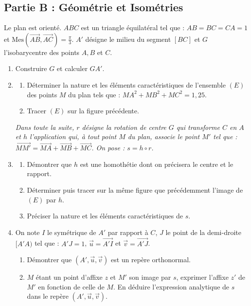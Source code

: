 \subsection*{Partie B : Géométrie et Isométries}
Le plan est orienté. $ABC$ est un triangle équilatéral tel que : $AB = BC = CA = 1$ et $\text{Mes}(\overrightarrow{AB}, \overrightarrow{AC}) = \frac{\pi}{3}$. $A'$ désigne le milieu du segment $[BC]$ et $G$ l'isobarycentre des points $A, B$ et $C$.
\begin{enumerate}
	\item Construire $G$ et calculer $GA'$.
	\item \begin{enumerate}
		\item Déterminer la nature et les éléments caractéristiques de l'ensemble $(E)$ des points $M$ du plan tels que : $MA^2 + MB^2 + MC^2 = 1,25$.
		\item Tracer $(E)$ sur la figure précédente.
	\end{enumerate}
	\textit{Dans toute la suite, $r$ désigne la rotation de centre $G$ qui transforme $C$ en $A$ et $h$ l'application qui, à tout point $M$ du plan, associe le point $M'$ tel que : $\overrightarrow{MM'} = \overrightarrow{MA} + \overrightarrow{MB} + \overrightarrow{MC}$. On pose : $s = h \circ r$.}
	\item \begin{enumerate}
		\item Démontrer que $h$ est une homothétie dont on précisera le centre et le rapport.
		\item Déterminer puis tracer sur la même figure que précédemment l'image de $(E)$ par $h$.
		\item Préciser la nature et les éléments caractéristiques de $s$.
	\end{enumerate}
	\item On note $I$ le symétrique de $A'$ par rapport à $C$, $J$ le point de la demi-droite $[A'A)$ tel que : $A'J = 1$, $\vec{u} = \overrightarrow{A'I}$ et $\vec{v} = \overrightarrow{A'J}$.
	\begin{enumerate}
		\item Démontrer que $(A', \vec{u}, \vec{v})$ est un repère orthonormal.
		\item $M$ étant un point d'affixe $z$ et $M'$ son image par $s$, exprimer l'affixe $z'$ de $M'$ en fonction de celle de $M$. En déduire l'expression analytique de $s$ dans le repère $(A', \vec{u}, \vec{v})$.
	\end{enumerate}
\end{enumerate}






